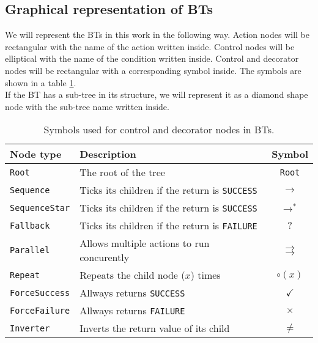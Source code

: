     \subsection{Graphical representation of BTs}
        We will represent the BTs in this work in the following way. Action nodes will be rectangular with the name of the action written inside. Control nodes will be elliptical with the name of the condition written inside. Control and decorator nodes will be rectangular with a corresponding symbol inside. The symbols are shown in a table \ref{tab:symbols}.\\
        If the BT has a sub-tree in its structure, we will represent it as a diamond shape node with the sub-tree name written inside.
        \begin{table}[H]
            \centering
            \begin{tabular}{|l|l|c|}
                \hline
                \textbf{Node type} & \textbf{Description} & \textbf{Symbol} \\
                \hline\hline
                \texttt{Root} & The root of the tree & \texttt{Root} \\
                \hline
                \texttt{Sequence} & Ticks its children if the return is \texttt{SUCCESS} & $\to$ \\
                \hline
                \texttt{SequenceStar} & Ticks its children if the return is \texttt{SUCCESS} & $\to^{*}$ \\
                \hline
                \texttt{Fallback} & Ticks its children if the return is \texttt{FAILURE} & $?$ \\
                \hline
                \texttt{Parallel} & Allows multiple actions to run concurently & $\rightrightarrows$ \\
                \hline
                \texttt{Repeat} & Repeats the child node ($x$) times & $\circ(x)$ \\
                \hline
                \texttt{ForceSuccess} & Allways returns \texttt{SUCCESS} & $\checkmark$ \\
                \hline
                \texttt{ForceFailure} & Allways returns \texttt{FAILURE} & $\times$ \\
                \hline
                \texttt{Inverter} & Inverts the return value of its child & $\neq$ \\
                \hline
            \end{tabular}
            \caption{Symbols used for control and decorator nodes in BTs.}
            \label{tab:symbols}
        \end{table}
    
